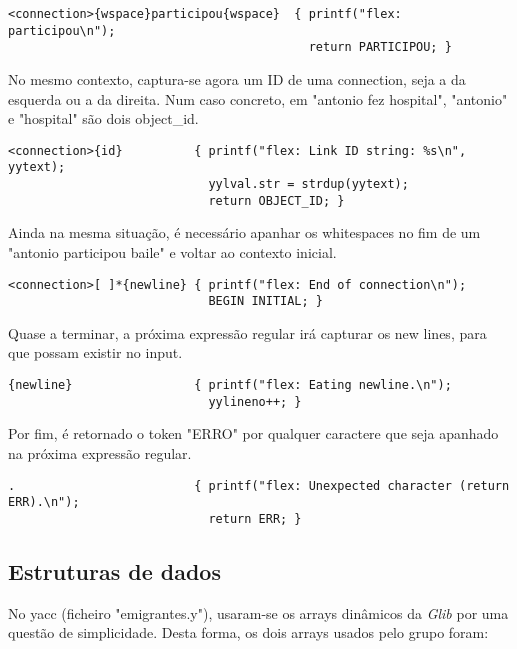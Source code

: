 \documentclass[a4paper]{article}
\begin{document}
\lstset{language=tex}
\begin{lstlisting}
<connection>{wspace}participou{wspace}  { printf("flex: participou\n");                          
                                          return PARTICIPOU; }
\end{lstlisting}


\bigskip
\par No mesmo contexto, captura-se agora um ID de uma connection, seja a da esquerda ou a da direita. Num caso concreto, em "antonio fez hospital", "antonio" e "hospital" são dois object\_id.

\lstset{language=tex}
\begin{lstlisting}
<connection>{id}          { printf("flex: Link ID string: %s\n", yytext);          
                            yylval.str = strdup(yytext); 
                            return OBJECT_ID; }
\end{lstlisting}


\bigskip
\par Ainda na mesma situação, é necessário apanhar os whitespaces no fim de um "antonio participou baile" e voltar ao contexto inicial.

\lstset{language=tex}
\begin{lstlisting}
<connection>[ ]*{newline} { printf("flex: End of connection\n");                   
                            BEGIN INITIAL; }
\end{lstlisting}


\bigskip
\par Quase a terminar, a próxima expressão regular irá capturar os new lines, para que possam existir no input.

\lstset{language=tex}
\begin{lstlisting}
{newline}                 { printf("flex: Eating newline.\n");                     
                            yylineno++; }
\end{lstlisting}

\bigskip
\par Por fim, é retornado o token "ERRO" por qualquer caractere que seja apanhado na próxima expressão regular.

\lstset{language=tex}
\begin{lstlisting}
.                         { printf("flex: Unexpected character (return ERR).\n");  
                            return ERR; }
\end{lstlisting}


\pagebreak
\subsection{Estruturas de dados}
\label{sec:3.4}
\hspace{3.5mm} No yacc (ficheiro "emigrantes.y"), usaram-se os arrays dinâmicos da \emph{Glib} por uma questão de simplicidade. Desta forma, os dois arrays usados pelo grupo foram:
\end{document}
